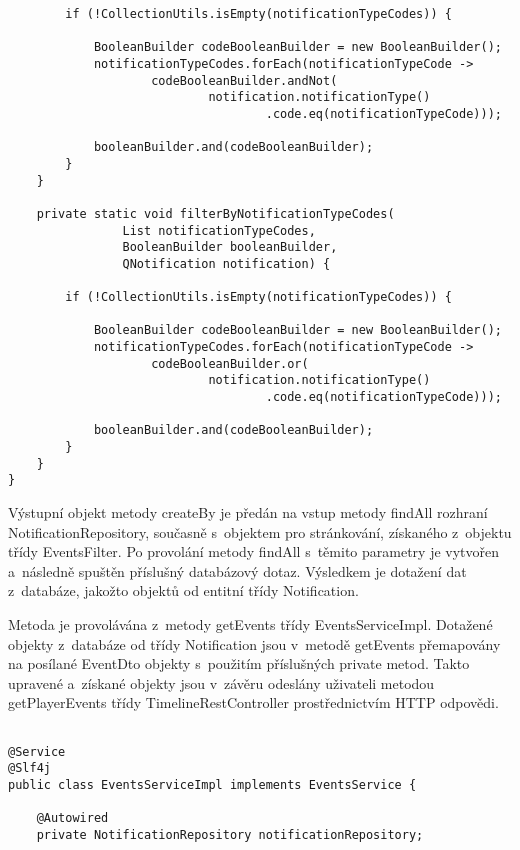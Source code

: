\documentclass[12pt]{article}
\begin{document}
{\begin{lstlisting}
        if (!CollectionUtils.isEmpty(notificationTypeCodes)) {

            BooleanBuilder codeBooleanBuilder = new BooleanBuilder();
            notificationTypeCodes.forEach(notificationTypeCode ->
                    codeBooleanBuilder.andNot(
                            notification.notificationType()
                                    .code.eq(notificationTypeCode)));

            booleanBuilder.and(codeBooleanBuilder);
        }
    }

    private static void filterByNotificationTypeCodes(
                List notificationTypeCodes,
                BooleanBuilder booleanBuilder,
                QNotification notification) {

        if (!CollectionUtils.isEmpty(notificationTypeCodes)) {

            BooleanBuilder codeBooleanBuilder = new BooleanBuilder();
            notificationTypeCodes.forEach(notificationTypeCode ->
                    codeBooleanBuilder.or(
                            notification.notificationType()
                                    .code.eq(notificationTypeCode)));

            booleanBuilder.and(codeBooleanBuilder);
        }
    }
}
\end{lstlisting}

Výstupní objekt metody createBy je předán na vstup metody findAll rozhraní NotificationRepository,
současně s~objektem pro stránkování, získaného z~objektu třídy EventsFilter. 
Po provolání metody findAll s~těmito parametry je vytvořen a~následně spuštěn příslušný databázový dotaz.
Výsledkem je dotažení dat z~databáze, jakožto objektů od entitní třídy Notification.

Metoda je provolávána z~metody getEvents třídy EventsServiceImpl.
Dotažené objekty z~databáze od třídy Notification jsou v~metodě getEvents
přemapovány na posílané EventDto objekty s~použitím příslušných private metod.
Takto upravené a~získané objekty jsou v~závěru odeslány uživateli metodou getPlayerEvents
třídy TimelineRestController prostřednictvím HTTP odpovědi.


\clearpage

\begin{lstlisting}

@Service
@Slf4j
public class EventsServiceImpl implements EventsService {

    @Autowired
    private NotificationRepository notificationRepository;
    

\end{lstlisting}}
\end{document}
